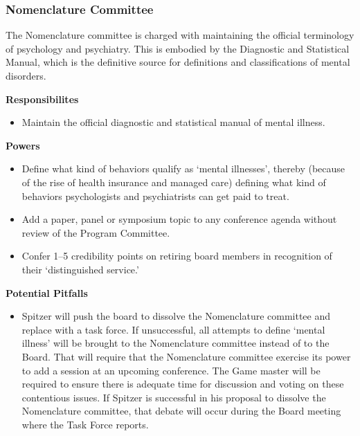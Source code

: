 \begin{refsection}
\begin{itemize}
\end{itemize}

\subsubsection{Nomenclature Committee}
\label{nomenclaturecommittee}

The Nomenclature committee is charged with maintaining the official terminology of psychology and psychiatry. This is embodied by the Diagnostic and Statistical Manual, which is the definitive source for definitions and classifications of mental disorders. 

\textbf{Responsibilites}

\begin{itemize}
\item Maintain the official diagnostic and statistical manual of mental illness.

\end{itemize}

\textbf{Powers}

\begin{itemize}
\item Define what kind of behaviors qualify as ‘mental illnesses’, thereby (because of the rise of health insurance and managed care) defining what kind of behaviors psychologists and psychiatrists can get paid to treat.

\item Add a paper, panel or symposium topic to any conference agenda without review of the Program Committee.

\item Confer 1--5 credibility points on retiring board members in recognition of their ‘distinguished service.’

\end{itemize}

\textbf{Potential Pitfalls}

\begin{itemize}
\item Spitzer will push the board to dissolve the Nomenclature committee and replace with a task force. If unsuccessful, all attempts to define ‘mental illness’ will be brought to the Nomenclature committee instead of to the Board. That will require that the Nomenclature committee exercise its power to add a session at an upcoming conference. The Game master will be required to ensure there is adequate time for discussion and voting on these contentious issues. If Spitzer is successful in his proposal to dissolve the Nomenclature committee, that debate will occur during the Board meeting where the Task Force reports.


\end{itemize}
\end{refsection}
